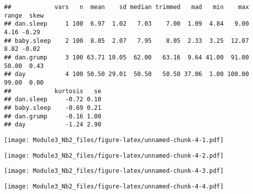 \documentclass[
]{article}
\newenvironment{Shaded}{\begin{snugshade}}{\end{snugshade}}
\newcommand{\CommentTok}[1]{\textcolor[rgb]{0.56,0.35,0.01}{\textit{#1}}}
\newcommand{\FunctionTok}[1]{\textcolor[rgb]{0.13,0.29,0.53}{\textbf{#1}}}
\newcommand{\NormalTok}[1]{#1}
\newcommand{\SpecialCharTok}[1]{\textcolor[rgb]{0.81,0.36,0.00}{\textbf{#1}}}
\begin{document}
\begin{verbatim}
##            vars   n  mean    sd median trimmed   mad   min    max range  skew
## dan.sleep     1 100  6.97  1.02   7.03    7.00  1.09  4.84   9.00  4.16 -0.29
## baby.sleep    2 100  8.05  2.07   7.95    8.05  2.33  3.25  12.07  8.82 -0.02
## dan.grump     3 100 63.71 10.05  62.00   63.16  9.64 41.00  91.00 50.00  0.43
## day           4 100 50.50 29.01  50.50   50.50 37.06  1.00 100.00 99.00  0.00
##            kurtosis   se
## dan.sleep     -0.72 0.10
## baby.sleep    -0.69 0.21
## dan.grump     -0.16 1.00
## day           -1.24 2.90
\end{verbatim}

\begin{Shaded}
\end{Shaded}

\texttt{[image: Module3\_Nb2\_files/figure-latex/unnamed-chunk-4-1.pdf]}

\begin{Shaded}
\end{Shaded}

\texttt{[image: Module3\_Nb2\_files/figure-latex/unnamed-chunk-4-2.pdf]}

\begin{Shaded}
\end{Shaded}

\texttt{[image: Module3\_Nb2\_files/figure-latex/unnamed-chunk-4-3.pdf]}

\begin{Shaded}
\end{Shaded}

\texttt{[image: Module3\_Nb2\_files/figure-latex/unnamed-chunk-4-4.pdf]}
\end{document}
